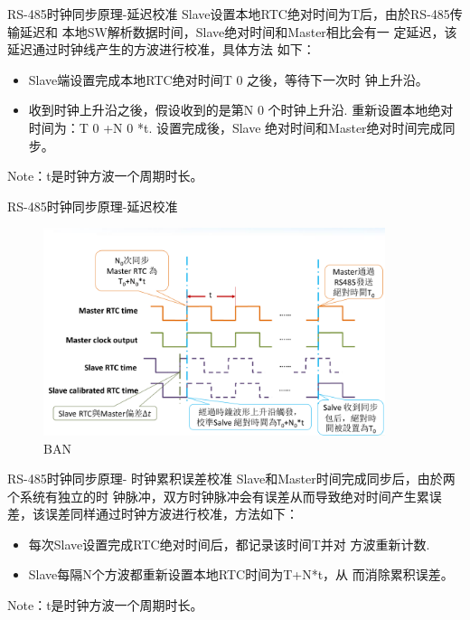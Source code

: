 \begin{frame}[fragile]{RS-485时钟同步原理-延迟校准}
  Slave设置本地RTC绝对时间为T后，由於RS-485传输延迟和
  本地SW解析数据时间，Slave绝对时间和Master相比会有一
  定延迟，该延迟通过时钟线产生的方波进行校准，具体方法
  如下：
\begin{itemize}
  \item Slave端设置完成本地RTC绝对时间T 0 之後，等待下一次时
  钟上升沿。
\item 收到时钟上升沿之後，假设收到的是第N 0 个时钟上升沿.
重新设置本地绝对时间为：T 0 +N 0 *t. 设置完成後，Slave
绝对时间和Master绝对时间完成同步。

\end{itemize}

Note：t是时钟方波一个周期时长。


\end{frame}




\begin{frame}[fragile]{RS-485时钟同步原理-延迟校准}

  \begin{figure}[htbp]
  \begin{center}
  \includegraphics[width=10cm]{img/delay1}
  \caption{BAN }
  \label{Overview}
  \end{center}
  \vspace{-0.5em}
  \end{figure}

\end{frame}




\begin{frame}[fragile]{RS-485时钟同步原理- 时钟累积误差校准}
  Slave和Master时间完成同步后，由於两个系统有独立的时
钟脉冲，双方时钟脉冲会有误差从而导致绝对时间产生累误
差，该误差同样通过时钟方波进行校准，方法如下：


\begin{itemize}
  \item  每次Slave设置完成RTC绝对时间后，都记录该时间T并对
  方波重新计数.
\item Slave每隔N个方波都重新设置本地RTC时间为T+N*t，从
而消除累积误差。


\end{itemize}

Note：t是时钟方波一个周期时长。

\end{frame}

